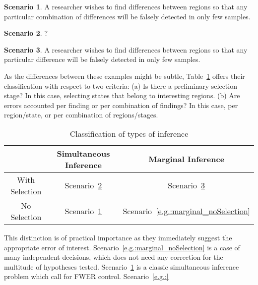 \documentclass[review,12pt]{article}
\theoremstyle{definition}
\newtheorem{scenario}{Scenario}[section]
\begin{document}
\begin{scenario}
A researcher wishes to find differences between regions so that any particular combination of differences will be falsely detected in only  few samples.
\label{e.g.:simultanous_noSelection}
\end{scenario}

\begin{scenario}
?
\label{e.g.:simultanous_Selection}
\end{scenario}

\begin{scenario}
A researcher wishes to find differences between regions so that any particular difference will be falsely detected in only  few samples.
\label{e.g.:marginal_Selection}
\end{scenario}

As the differences between these examples might be subtle, Table~\ref{tab:simultanous_vs_selective} offers their classification with respect to two criteria: (a) Is there a preliminary selection stage? In this case, selecting states that belong to interesting regions. 
(b) Are errors accounted per finding or per combination of findings? In this case, per region/state, or per combination of regions/stages.

\begin{table}[h]
  \centering
    \caption{Classification of types of inference}
\begin{tabular}{|c|c|c|}
\hline \rule[-1ex]{0pt}{1.5ex}    & Simultaneous Inference & Marginal Inference \\ 
\hline
\hline \rule[-1ex]{0pt}{1.5ex}  With Selection & Scenario~\ref{e.g.:simultanous_Selection} & Scenario~\ref{e.g.:marginal_Selection} \\ 
\hline \rule[-1ex]{0pt}{1.5ex}  No Selection &  Scenario~\ref{e.g.:simultanous_noSelection} & Scenario~\ref{e.g.:marginal_noSelection} \\ 
\hline 
\end{tabular} 
  \label{tab:simultanous_vs_selective}
\end{table}

This distinction is of practical importance as they immediately suggest the appropriate error of interest. 
Scenario~\ref{e.g.:marginal_noSelection} is a case of many independent decisions, which does not need any correction for the multitude of hypotheses tested. 
Scenario~\ref{e.g.:simultanous_noSelection} is a classic simultaneous inference problem which call for FWER control.
Scenario~\ref{e.g.:}
\end{document}
